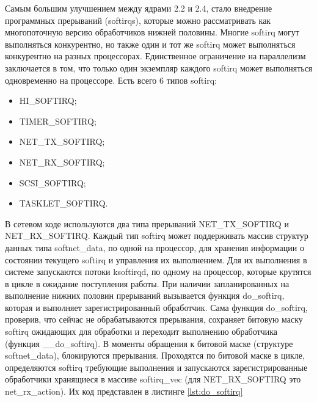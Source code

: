 Самым большим улучшением между ядрами 2.2 и 2.4, стало внедрение программных прерываний (softirqs), которые можно рассматривать как многопоточную версию обработчиков нижней половины. Многие softirq могут выполняться конкурентно, но также один и тот же softirq может выполняться конкурентно на разных процессорах. Единственное ограничение на параллелизм заключается в том, что только один экземпляр каждого softirq может выполняться одновременно на процессоре. Есть всего 6 типов softirq:
\begin{itemize}[label=---]
	\item HI\_SOFTIRQ;
	\item TIMER\_SOFTIRQ;
	\item NET\_TX\_SOFTIRQ;
	\item NET\_RX\_SOFTIRQ;
	\item SCSI\_SOFTIRQ;
	\item TASKLET\_SOFTIRQ.
\end{itemize}

В сетевом коде используются два типа прерываний NET\_TX\_SOFTIRQ и NET\_RX\_SOFTIRQ. Каждый тип softirq может поддерживать массив структур данных типа softnet\_data, по одной на процессор, для хранения информации о состоянии текущего softirq и управления их выполнением. Для их выполнения в системе запускаются потоки ksoftirqd, по одному на процессор, которые крутятся в цикле в ожидание поступления работы. При наличии запланированных на выполнение нижних половин прерываний вызывается функция do\_softirq, которая и выполняет зарегистрированный обработчик. Сама функция do\_softirq, проверив, что сейчас не обрабатываются прерывания, сохраняет битовую маску softirq ожидающих для обработки и переходит выполнению обработчика (функция \_\_do\_softirq). В моменты обращения к битовой маске (структуре softnet\_data), блокируются прерывания. Проходятся по битовой маске в цикле, определяются softirq требующие выполнения и запускаются зарегистрированные обработчики хранящиеся в массиве softirq\_vec (для NET\_RX\_SOFTIRQ это net\_rx\_action). Их код представлен в листинге \ref{lst:do_softirq}

